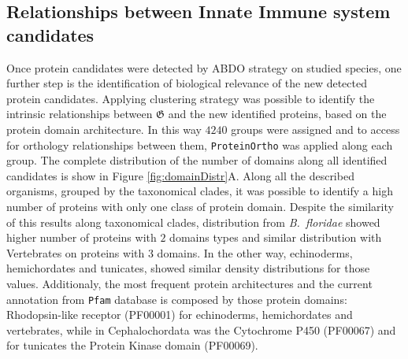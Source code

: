 \documentclass[11pt]{article}
\begin{document}

\subsection*{Relationships between Innate Immune system candidates} 
\label{Orthology}
Once protein candidates were detected by ABDO strategy on studied species, 
one further step is the identification of biological relevance of the 
new detected protein candidates. Applying clustering strategy was 
possible to identify the intrinsic relationships between 
$\boldsymbol{\mathfrak{G}}$ and the new identified proteins, based on the 
protein domain architecture. In this way $4240$ groups were assigned and to 
access for orthology relationships between them, \texttt{ProteinOrtho} was 
applied along each group. 
The complete distribution of the number of domains along all 
identified candidates is show in Figure \ref{fig:domainDistr}A. Along all 
the described organisms, grouped by the taxonomical clades, it was possible to
identify a high number of proteins with only one class of protein domain. 
Despite the similarity of this results along taxonomical clades, distribution 
from \textsl{B.\ floridae} showed higher number of proteins with $2$ domains 
types and similar distribution with Vertebrates on proteins with $3$ domains. 
In the other way, echinoderms, hemichordates and tunicates, showed similar 
density distributions for those values. Additionaly, the most frequent 
protein architectures and the current annotation from \texttt{Pfam} database is 
composed by those protein domains: Rhodopsin-like receptor (PF00001) for 
echinoderms, hemichordates and vertebrates, while in Cephalochordata was the 
Cytochrome P450 (PF00067) and for tunicates the Protein Kinase domain (PF00069). 
\end{document}
